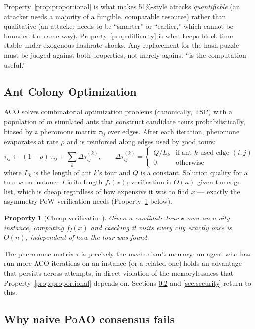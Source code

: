 \documentclass[journal]{IEEEtran}
\newtheorem{property}{Property}
\begin{document}
Property~\ref{prop:proportional} is what makes 51\%-style attacks
\emph{quantifiable} (an attacker needs a majority of a fungible, comparable
resource) rather than qualitative (an attacker needs to be ``smarter'' or
``earlier,'' which cannot be bounded the same way). Property~\ref{prop:difficulty}
is what keeps block time stable under exogenous hashrate shocks. Any
replacement for the hash puzzle must be judged against both properties, not
merely against ``is the computation useful.''

\subsection{Ant Colony Optimization}

ACO \cite{dorigo2004aco} solves combinatorial optimization problems (canonically,
TSP) with a population of $m$ simulated ants that construct candidate tours
probabilistically, biased by a pheromone matrix $\tau_{ij}$ over edges. After
each iteration, pheromone evaporates at rate $\rho$ and is reinforced along
edges used by good tours:
\[
\tau_{ij} \leftarrow (1-\rho)\,\tau_{ij} + \sum_{k} \Delta\tau_{ij}^{(k)},
\qquad
\Delta\tau_{ij}^{(k)} = \begin{cases} Q / L_k & \text{if ant } k \text{ used edge } (i,j) \\ 0 & \text{otherwise} \end{cases}
\]
where $L_k$ is the length of ant $k$'s tour and $Q$ is a constant. Solution
quality for a tour $x$ on instance $I$ is its length $f_I(x)$; verification is
$O(n)$ given the edge list, which is cheap regardless of how expensive it was
to find $x$ --- exactly the asymmetry PoW verification needs
(Property~\ref{prop:verification} below).

\begin{property}[Cheap verification]
\label{prop:verification}
Given a candidate tour $x$ over an $n$-city instance, computing $f_I(x)$ and
checking it visits every city exactly once is $O(n)$, independent of how the
tour was found.
\end{property}

The pheromone matrix $\tau$ is precisely the mechanism's memory: an agent who
has run more ACO iterations on an instance (or a related one) holds an
advantage that persists across attempts, in direct violation of the
memorylessness that Property~\ref{prop:proportional} depends on. Sections
\ref{sec:why-hard-2} and \ref{sec:security} return to this.

\subsection{Why naive PoAO consensus fails}
\label{sec:why-hard-2}
\end{document}
